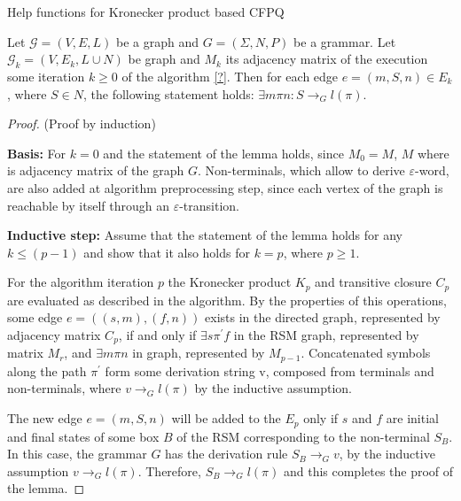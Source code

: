 \begin{algorithm}[h]
\begin{algorithmic}[1]
\tiny
\caption{Help functions for Kronecker product based CFPQ}
\label{tensor:cfpq:help}
    \State {}
\EndFunction
{}
    \State {}
\EndFunction
\end{algorithmic}
\end{algorithm}

\begin{lemma}
    \label{lemma:algo:correctness}
    Let $\mathcal{G} = (V,E,L)$ be a graph and $G = (\Sigma, N, P)$ be a grammar.
    Let $\mathcal{G}_k = (V,E_k,L \cup N)$ be graph and $M_k$ its adjacency
    matrix of the execution some iteration $k \geq 0$ of the algorithm \ref{?}.
    Then for each edge $e = (m,S,n) \in E_k$, where $S \in N$,
    the following statement holds: $\exists m\pi n: S \to_{G} l(\pi)$.
\end{lemma}

\begin{proof}{(Proof by induction)}

    \textbf{Basis:} For $k = 0$ and the statement of the lemma holds, since
    $M_0 = M$, $M$ where is adjacency matrix of the graph $G$. Non-terminals,
    which allow to derive $\varepsilon$-word, are also added at algorithm
    preprocessing step, since each vertex of the graph is reachable by itself 
    through an $\varepsilon$-transition.
    
    \textbf{Inductive step:} Assume that the statement of the lemma holds for any
    $k \leq (p - 1)$ and show that it also holds for $k = p$, where $p \geq 1$.
    
    For the algorithm iteration $p$ the Kronecker product $K_p$ and transitive
    closure $C_p$ are evaluated as described in the algorithm. By the properties
    of this operations, some edge $e = ((s,m),(f,n))$ exists in the directed
    graph, represented by adjacency matrix $C_p$, if and only if $\exists s
    \pi ^{'} f$ in the RSM graph, represented by matrix $M_r$, and 
    $\exists m \pi n$ in graph, represented by $M_{p-1}$. Concatenated symbols 
    along the path $\pi^{'}$ form some derivation string v, composed from terminals
    and non-terminals, where $v \to_G l(\pi)$  by the inductive assumption.
    
    The new edge $e = (m,S,n)$ will be added to the $E_p$ only if $s$ and $f$ 
    are initial and final states of some box $B$ of the RSM corresponding to 
    the non-terminal $S_B$. In this case, the grammar $G$ has the derivation rule
    $S_B \to_G v$, by the inductive assumption $v \to_G l(\pi)$. Therefore, 
    $S_B \to_G l(\pi)$ and this completes the proof of the lemma.
    
\end{proof}

